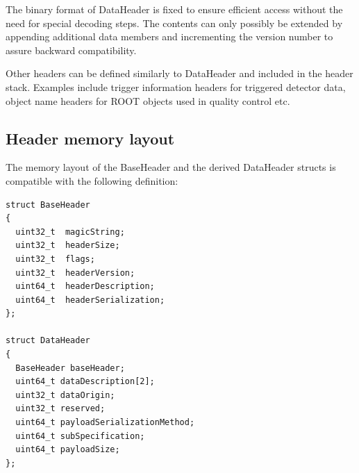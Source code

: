 \documentclass[a4paper,twoside]{article}
\begin{document}
The binary format of DataHeader is fixed to ensure efficient access without the need for special decoding steps. The contents can only possibly be extended by appending additional data members and incrementing the version number to assure backward compatibility.

Other headers can be defined similarly to DataHeader and included in the header stack. Examples include trigger information headers for triggered detector data, object name headers for ROOT objects used in quality control etc.

\subsection{Header memory layout}
The memory layout of the BaseHeader and the derived DataHeader structs is compatible with the following definition:

\lstset{language=C++
}
\begin{lstlisting}
struct BaseHeader
{
  uint32_t  magicString;
  uint32_t  headerSize;
  uint32_t  flags;
  uint32_t  headerVersion;
  uint64_t  headerDescription;
  uint64_t  headerSerialization;
};

struct DataHeader
{
  BaseHeader baseHeader;
  uint64_t dataDescription[2];
  uint32_t dataOrigin;
  uint32_t reserved;
  uint64_t payloadSerializationMethod;
  uint64_t subSpecification;
  uint64_t payloadSize;
};

\end{lstlisting}
\end{document}

